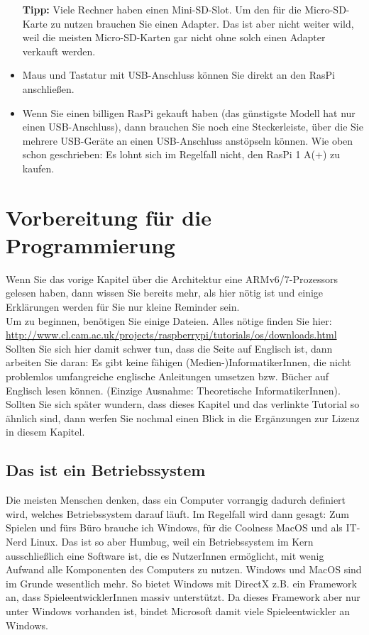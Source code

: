 \begin{itemize}
	\textbf{Tipp:} Viele Rechner haben einen Mini-SD-Slot. Um den für die Micro-SD-Karte zu nutzen brauchen Sie einen Adapter. Das ist aber nicht weiter wild, weil die meisten Micro-SD-Karten gar nicht ohne solch einen Adapter verkauft werden.
	\item Maus und Tastatur mit USB-Anschluss können Sie direkt an den RasPi anschließen.
	\item Wenn Sie einen billigen RasPi gekauft haben (das günstigste Modell hat nur einen USB-Anschluss), dann brauchen Sie noch eine \glqq{}Steckerleiste\grqq{}, über die Sie mehrere USB-Geräte an einen USB-Anschluss anstöpseln können. Wie oben schon geschrieben: Es lohnt sich im Regelfall nicht, den RasPi 1 A(+) zu kaufen.
\end{itemize}

\section{Vorbereitung für die Programmierung}

Wenn Sie das vorige Kapitel über die Architektur eine ARMv6/7-Prozessors gelesen haben, dann wissen Sie bereits mehr, als hier nötig ist und einige Erklärungen werden für Sie nur kleine Reminder sein.\\

Um zu beginnen, benötigen Sie einige Dateien. Alles nötige finden Sie hier: \url{http://www.cl.cam.ac.uk/projects/raspberrypi/tutorials/os/downloads.html} Sollten Sie sich hier damit schwer tun, dass die Seite auf Englisch ist, dann arbeiten Sie daran: Es gibt keine fähigen (Medien-)InformatikerInnen, die nicht problemlos umfangreiche englische Anleitungen umsetzen bzw. Bücher auf Englisch lesen können. (Einzige Ausnahme: Theoretische InformatikerInnen). Sollten Sie sich später wundern, dass dieses Kapitel und das verlinkte Tutorial so ähnlich sind, dann werfen Sie nochmal einen Blick in die Ergänzungen zur Lizenz in diesem Kapitel.\\

\subsection{Das ist ein Betriebssystem}

Die meisten Menschen denken, dass ein Computer vorrangig dadurch definiert wird, welches Betriebssystem darauf läuft. Im Regelfall wird dann gesagt: Zum Spielen und fürs Büro brauche ich Windows, für die Coolness MacOS und als IT-Nerd Linux. Das ist so aber Humbug, weil ein Betriebssystem im Kern ausschließlich eine Software ist, die es NutzerInnen ermöglicht, mit wenig Aufwand alle Komponenten des Computers zu nutzen. Windows und MacOS sind im Grunde wesentlich mehr. So bietet Windows mit DirectX z.B. ein Framework an, dass SpieleentwicklerInnen massiv unterstützt. Da dieses Framework aber nur unter Windows vorhanden ist, bindet Microsoft damit viele Spieleentwickler an Windows.\\


